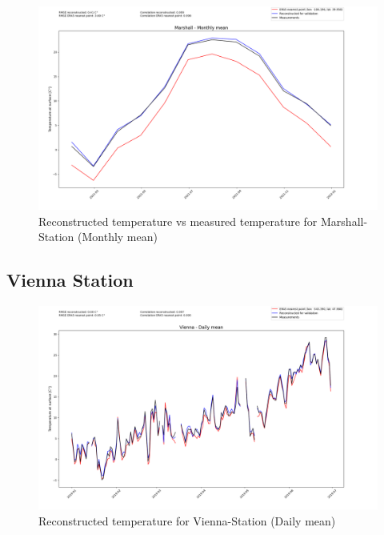 \begin{figure}
    \centering
    \includegraphics[width=\textwidth]{resources/images/charts/marshall_eval_grib_final/Marshall - Monthly mean.png}
    \caption{Reconstructed temperature vs measured temperature for Marshall-Station (Monthly mean)}
\end{figure}

\newpage

\subsection*{Vienna Station}

\begin{figure}
    \centering
    \includegraphics[width=\textwidth]{resources/images/charts/vienna_eval_grib_final/Vienna - Daily mean.png}
    \caption{Reconstructed temperature for Vienna-Station (Daily mean)}
\end{figure}

